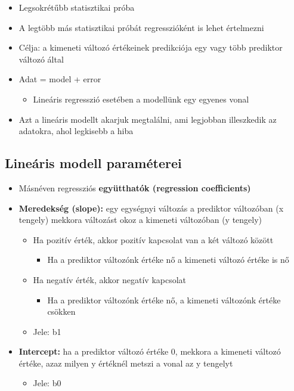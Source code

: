 \documentclass[
  letterpaper,
  DIV=11,
  numbers=noendperiod]{scrreprt}
\providecommand{\tightlist}{%
  \setlength{\itemsep}{0pt}\setlength{\parskip}{0pt}}\usepackage{longtable,booktabs,array}
\begin{document}
\begin{itemize}
\item
  Legsokrétűbb statisztikai próba
\item
  A legtöbb más statisztikai próbát regresszióként is lehet értelmezni
\item
  Célja: a kimeneti változó értékeinek predikciója egy vagy több
  prediktor változó által
\item
  Adat = model + error

  \begin{itemize}
  \tightlist
  \item
    Lineáris regresszió esetében a modellünk egy egyenes vonal
  \end{itemize}
\item
  Azt a lineáris modellt akarjuk megtalálni, ami legjobban illeszkedik
  az adatokra, ahol legkisebb a hiba
\end{itemize}

\hypertarget{lineuxe1ris-modell-paramuxe9terei}{%
\subsection{Lineáris modell
paraméterei}\label{lineuxe1ris-modell-paramuxe9terei}}

\begin{itemize}
\item
  Másnéven regressziós \textbf{együtthatók (regression coefficients)}
\item
  \textbf{Meredekség (slope):} egy egységnyi változás a prediktor
  változóban (x tengely) mekkora változást okoz a kimeneti változóban (y
  tengely)

  \begin{itemize}
  \item
    Ha pozitív érték, akkor pozitív kapcsolat van a két változó között

    \begin{itemize}
    \tightlist
    \item
      Ha a prediktor változónk értéke nő a kimeneti változó értéke is nő
    \end{itemize}
  \item
    Ha negatív érték, akkor negatív kapcsolat

    \begin{itemize}
    \tightlist
    \item
      Ha a prediktor változónk értéke nő, a kimeneti változónk értéke
      csökken
    \end{itemize}
  \item
    Jele: b1
  \end{itemize}
\item
  \textbf{Intercept:} ha a prediktor változó értéke 0, mekkora a
  kimeneti változó értéke, azaz milyen y értéknél metszi a vonal az y
  tengelyt

  \begin{itemize}
  \tightlist
  \item
    Jele: b0
  \end{itemize}
\end{itemize}
\end{document}
